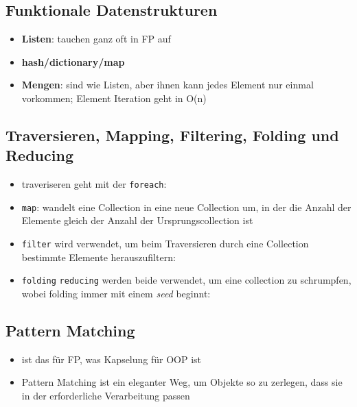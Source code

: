 \subsection{Funktionale Datenstrukturen}
\begin{itemize}
  \item \textbf{Listen}: tauchen ganz oft in FP auf
  
  
  
  \item \textbf{hash/dictionary/map}
    
  \item \textbf{Mengen}: sind wie Listen, aber ihnen kann jedes
  Element nur einmal vorkommen; Element Iteration geht in O(n)
\end{itemize}


\subsection{Traversieren, Mapping, Filtering, Folding und Reducing}
\begin{itemize}
  \item traveriseren geht mit der \texttt{foreach}:
  
  
  
  \item \texttt{map}: wandelt eine Collection in eine neue Collection um,
  in der die Anzahl der Elemente gleich der Anzahl der Ursprungscollection
  ist
  
  
  
  \item \texttt{filter} wird verwendet, um beim Traversieren durch eine
  Collection bestimmte Elemente herauszufiltern:
  
  
  
  \item \texttt{folding} \und \texttt{reducing} werden beide verwendet, um
  eine collection zu schrumpfen, wobei folding immer mit einem 
  \textit{seed} beginnt:
  
    
\end{itemize}


\subsection{Pattern Matching}
\begin{itemize}
  \item ist das für FP, was Kapselung für OOP ist
  \item Pattern Matching ist ein eleganter Weg, um Objekte so zu zerlegen,
  dass sie in der erforderliche Verarbeitung passen
\end{itemize}


